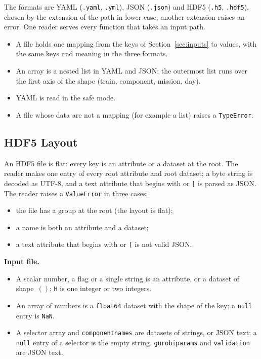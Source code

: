 \documentclass[11pt,a4paper]{article}
\theoremstyle{plain}
\theoremstyle{definition}
\renewcommand{\_}{\textunderscore\allowbreak{}}
\begin{document}
The formats are YAML (\texttt{.yaml}, \texttt{.yml}), JSON (\texttt{.json}) and HDF5 (\texttt{.h5}, \texttt{.hdf5}), chosen by the extension of the path in lower case; another extension raises an error.
One reader serves every function that takes an input path.
\begin{itemize}[leftmargin=1.5em]
  \item A file holds one mapping from the keys of Section~\ref{sec:inputs} to values, with the same keys and meaning in the three formats.
  \item An array is a nested list in YAML and JSON; the outermost list runs over the first axis of the shape (train, component, mission, day).
  \item YAML is read in the safe mode.
  \item A file whose data are not a mapping (for example a list) raises a \texttt{TypeError}.
\end{itemize}

\subsection{HDF5 Layout}\label{sec:schema_hdf5}

An HDF5 file is flat: every key is an attribute or a dataset at the root.
The reader makes one entry of every root attribute and root dataset; a byte string is decoded as UTF-8, and a text attribute that begins with \texttt{} or \texttt{[} is parsed as JSON.
The reader raises a \texttt{ValueError} in three cases:
\begin{itemize}[nosep,leftmargin=1.5em]
  \item the file has a group at the root (the layout is flat);
  \item a name is both an attribute and a dataset;
  \item a text attribute that begins with \texttt{} or \texttt{[} is not valid JSON.
\end{itemize}

\textbf{Input file.}
\begin{itemize}[leftmargin=1.5em]
  \item A scalar number, a flag or a single string is an attribute, or a dataset of shape~$()$; \texttt{H} is one integer or two integers.
  \item An array of numbers is a \texttt{float64} dataset with the shape of the key; a \texttt{null} entry is \texttt{NaN}.
  \item A selector array and \texttt{component\_names} are datasets of strings, or JSON text; a \texttt{null} entry of a selector is the empty string. \texttt{gurobi\_params} and \texttt{validation} are JSON text.
\end{itemize}
\end{document}
